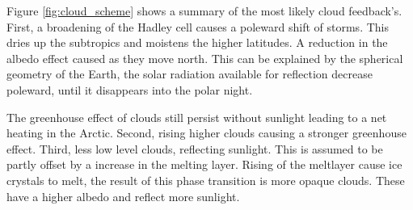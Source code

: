 Figure \ref{fig:cloud_scheme} shows a summary of the most likely cloud feedback's. First, a broadening of the Hadley cell causes a poleward shift of storms. This dries up the subtropics and moistens the higher latitudes. A reduction in the albedo effect caused as they move north. This can be explained by the spherical geometry of the Earth, the solar radiation available for reflection decrease poleward, until it disappears into the polar night. 

The greenhouse effect of clouds still persist without sunlight leading to a net heating in the Arctic. Second, rising higher clouds causing a stronger greenhouse effect. Third, less low level clouds, reflecting sunlight. This is assumed to be partly offset by a increase in the melting layer. Rising of the meltlayer cause ice crystals to melt, the result of this phase transition is more opaque clouds. These have a higher albedo and reflect more sunlight. 